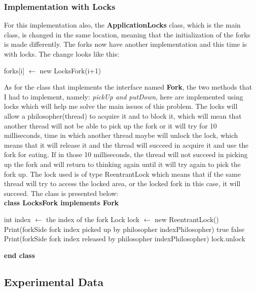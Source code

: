 \documentclass[14pt]{article}
\begin{document}
\subsubsection{Implementation with Locks}
For this implementation also, the \textbf{ApplicationLocks} class, which is the main class, is changed in the same location, meaning that the initialization of the forks is made differently. The forks now have another implementation and this time is with locks. The change looks like this:
\begin{algorithmic}
        \State forks[i] $\gets$ new LocksFork(i+1)
    \EndFor
\end{algorithmic}
\vspace{2.5 mm}
As for the class that implements the interface named \textbf{Fork}, the two methods that I had to implement, namely: \textit{pickUp and putDown}, here are implemented using locks which will help me solve the main issues of this problem. The locks will allow a philosopher(thread) to acquire it and to block it, which will mean that another thread will not be able to pick up the fork or it will try for 10 milliseconds, time in which another thread maybe will unlock the lock, which means that it will release it and the thread will succeed in acquire it and use the fork for eating. If in those 10 milliseconds, the thread will not succeed in picking up the fork and will return to thinking again until it will try again to pick the fork up. The lock used is of type ReentrantLock which means that if the same thread will try to access the locked area, or the locked fork in this case, it will succeed. The class is presented below:
\vspace{2.5 mm}
\\\textbf{class LocksFork implements Fork}
\begin{algorithmic}
\State int index $\gets$ the index of the fork
\State Lock lock $\gets$ new ReentrantLock()
        \State Print(forkSide fork index picked up by philosopher indexPhilosopher)
        \State \Return true
    \EndIf
    \State \Return false
\EndFunction
\vspace{1 mm}
    \State Print(forkSide fork index released by philosopher indexPhilosopher)
    \State lock.unlock
\EndFunction
\end{algorithmic}
\textbf{end class}
\subsection{Experimental Data}
\end{document}
